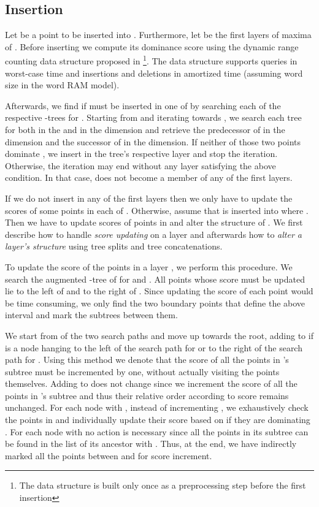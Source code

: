 \documentclass{llncs}
\begin{document}
\subsection{Insertion} \label{subsection:Insertion}
Let  be a point to be inserted into . Furthermore, let  be the first  layers of maxima of . Before inserting  we compute its dominance score using the dynamic range counting data structure proposed in \cite{HeMunroWADS11}\footnote{The data structure is built only once as a preprocessing step before the first insertion}. The data structure supports queries in  worst-case time and insertions and deletions in  amortized time (assuming word size  in the word RAM model).

Afterwards, we find if  must be inserted in one of  by searching each of the  respective -trees for . Starting from  and iterating towards , we search each tree for  both in the  and in the  dimension and retrieve the predecessor of  in the  dimension and the successor of  in the  dimension. If neither of those two points dominate , we insert  in the tree's respective layer and stop the iteration. Otherwise, the iteration may end without any layer satisfying the above condition. In that case,  does not become a member of any of the  first layers.

If we do not insert  in any of the  first layers then we only have to update the scores of some points in each of . Otherwise, assume that  is inserted into  where . Then we have to update scores of points in  and alter the structure of . We first describe how to handle \emph{score updating} on a layer and afterwards how to \emph{alter a layer's structure} using tree splits and tree concatenations.


To update the score of the points in a layer , we perform this procedure. We search the augmented -tree of  for  and . All points whose score must be updated lie to the left of  and to the right of . Since updating the score of each point would be time consuming, we only find the two boundary points that define the above interval and mark the subtrees between them.

We start from  of the two search paths and move up towards the root, adding  to  if  is a node hanging to the left of the search path for  or to the right of the search path for . Using this method we denote that the score of all the points in 's subtree must be incremented by one, without actually visiting the points themselves. Adding  to  does not change  since we increment the score of all the points in 's subtree and thus their relative order according to score remains unchanged. For each node  with , instead of incrementing , we exhaustively check the points in  and individually update their score based on if they are dominating . For each node with  no action is necessary since all the points in its subtree can be found in the  list of its ancestor with . Thus, at the end, we have indirectly marked all the points between  and  for score increment.
\end{document}
